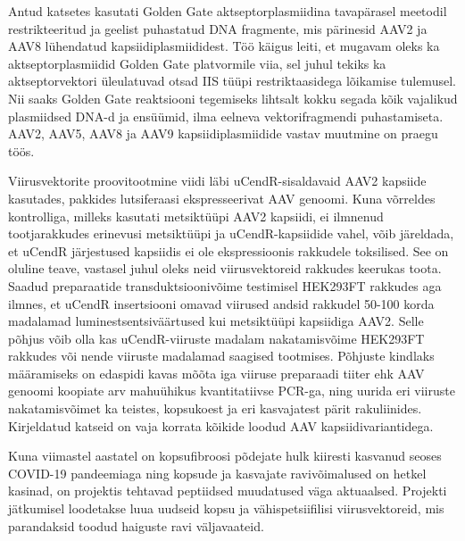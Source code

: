 \documentclass{trkut}%
\begin{document}
Antud katsetes kasutati Golden Gate aktseptorplasmiidina tavapärasel meetodil restrikteeritud ja geelist puhastatud DNA fragmente, mis pärinesid AAV2 ja AAV8 lühendatud kapsiidiplasmiididest. Töö käigus leiti, et mugavam oleks ka aktseptorplasmiidid Golden Gate platvormile viia, sel juhul tekiks ka aktseptorvektori üleulatuvad otsad IIS tüüpi restriktaasidega lõikamise tulemusel. Nii saaks Golden Gate reaktsiooni tegemiseks lihtsalt kokku segada kõik vajalikud plasmiidsed DNA-d ja ensüümid, ilma eelneva vektorifragmendi puhastamiseta. AAV2, AAV5, AAV8 ja AAV9 kapsiidiplasmiidide vastav muutmine on praegu töös.
 

Viirusvektorite proovitootmine viidi läbi uCendR-sisaldavaid AAV2 kapsiide kasutades, pakkides lutsiferaasi ekspresseerivat AAV genoomi. Kuna võrreldes kontrolliga, milleks kasutati metsiktüüpi AAV2 kapsiidi, ei ilmnenud tootjarakkudes erinevusi metsiktüüpi ja uCendR-kapsiidide vahel, võib järeldada, et uCendR järjestused kapsiidis ei ole ekspressioonis rakkudele toksilised. See on oluline teave, vastasel juhul oleks neid viirusvektoreid rakkudes keerukas toota. Saadud preparaatide transduktsioonivõime testimisel HEK293FT rakkudes aga ilmnes, et uCendR insertsiooni omavad viirused andsid rakkudel 50-100 korda madalamad luminestsentsiväärtused kui metsiktüüpi kapsiidiga AAV2. Selle põhjus võib olla kas uCendR-viiruste madalam nakatamisvõime HEK293FT rakkudes või nende viiruste madalamad saagised tootmises. Põhjuste kindlaks määramiseks on edaspidi kavas mõõta iga viiruse preparaadi tiiter ehk AAV genoomi koopiate arv mahuühikus kvantitatiivse PCR-ga, ning uurida eri viiruste nakatamisvõimet ka teistes, kopsukoest ja eri kasvajatest pärit rakuliinides. Kirjeldatud katseid on vaja korrata kõikide loodud AAV kapsiidivariantidega. 

Kuna viimastel aastatel on kopsufibroosi põdejate hulk kiiresti kasvanud seoses COVID-19 pandeemiaga ning kopsude ja kasvajate ravivõimalused on hetkel kasinad, on projektis tehtavad peptiidsed muudatused väga aktuaalsed. Projekti jätkumisel loodetakse luua uudseid kopsu ja vähispetsiifilisi viirusvektoreid, mis parandaksid toodud haiguste ravi väljavaateid.

\end{document}
